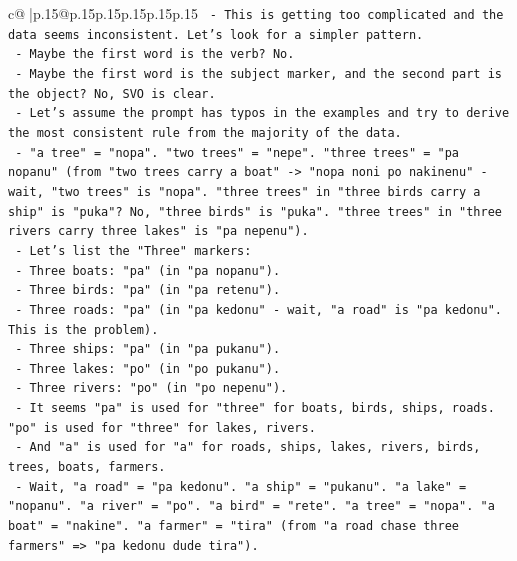 \documentclass{article}
\begin{document}
{\begin{supertabular}{c@{$\;$}|p{.15\linewidth}@{}p{.15\linewidth}p{.15\linewidth}p{.15\linewidth}p{.15\linewidth}p{.15\linewidth}}
{{{\texttt{                         {-} This is getting too complicated and the data seems inconsistent. Let's look for a simpler pattern.} \\
\texttt{                         {-} Maybe the first word is the verb? No.} \\
\texttt{                         {-} Maybe the first word is the subject marker, and the second part is the object? No, SVO is clear.} \\
\texttt{                         {-} Let's assume the prompt has typos in the examples and try to derive the most consistent rule from the majority of the data.} \\
\texttt{                           {-} "a tree" = "nopa". "two trees" = "nepe". "three trees" = "pa nopanu" (from "two trees carry a boat" {-}> "nopa noni po nakinenu" {-} wait, "two trees" is "nopa". "three trees" in "three birds carry a ship" is "puka"? No, "three birds" is "puka". "three trees" in "three rivers carry three lakes" is "pa nepenu").} \\
\texttt{                           {-} Let's list the "Three" markers:} \\
\texttt{                             {-} Three boats: "pa" (in "pa nopanu").} \\
\texttt{                             {-} Three birds: "pa" (in "pa retenu").} \\
\texttt{                             {-} Three roads: "pa" (in "pa kedonu" {-} wait, "a road" is "pa kedonu". This is the problem).} \\
\texttt{                             {-} Three ships: "pa" (in "pa pukanu").} \\
\texttt{                             {-} Three lakes: "po" (in "po pukanu").} \\
\texttt{                             {-} Three rivers: "po" (in "po nepenu").} \\
\texttt{                           {-} It seems "pa" is used for "three" for boats, birds, ships, roads. "po" is used for "three" for lakes, rivers.} \\
\texttt{                           {-} And "a" is used for "a" for roads, ships, lakes, rivers, birds, trees, boats, farmers.} \\
\texttt{                           {-} Wait, "a road" = "pa kedonu". "a ship" = "pukanu". "a lake" = "nopanu". "a river" = "po". "a bird" = "rete". "a tree" = "nopa". "a boat" = "nakine". "a farmer" = "tira" (from "a road chase three farmers" => "pa kedonu dude tira").} \\
}}}
\end{supertabular}}
\end{document}
